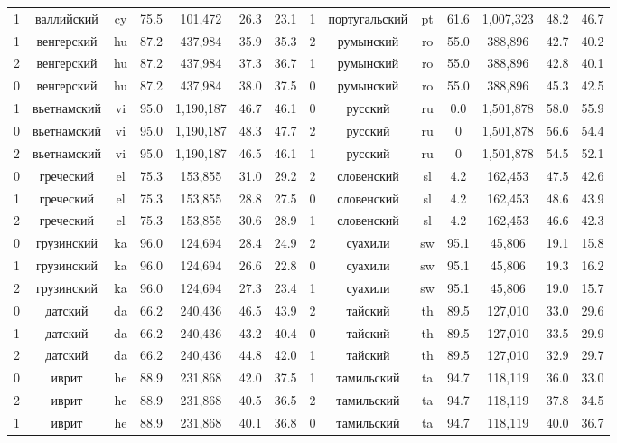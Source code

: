 \begin{table*}
{\begin{tabular}{|c|c|c|c|c|c|c|||c|c|c|c|c|c|c|}
1 & валлийский & cy & 75.5 & 101,472 & 26.3 & 23.1 & 1 & португальский & pt & 61.6 & 1,007,323 & 48.2 & 46.7\\
1 & венгерский & hu & 87.2 & 437,984 & 35.9 & 35.3 & 2 & румынский & ro & 55.0 & 388,896 & 42.7 & 40.2\\
2 & венгерский & hu & 87.2 & 437,984 & 37.3 & 36.7 & 1 & румынский & ro & 55.0 & 388,896 & 42.8 & 40.1\\
0 & венгерский & hu & 87.2 & 437,984 & 38.0 & 37.5 & 0 & румынский & ro & 55.0 & 388,896 & 45.3 & 42.5\\
1 & вьетнамский & vi & 95.0 & 1,190,187 & 46.7 & 46.1 & 0 & русский & ru & 0.0 & 1,501,878 & 58.0 & 55.9\\
0 & вьетнамский & vi & 95.0 & 1,190,187 & 48.3 & 47.7 & 2 & русский & ru & 0 & 1,501,878 & 56.6 & 54.4\\
2 & вьетнамский & vi & 95.0 & 1,190,187 & 46.5 & 46.1 & 1 & русский & ru & 0 & 1,501,878 & 54.5 & 52.1\\
0 & греческий & el & 75.3 & 153,855 & 31.0 & 29.2 & 2 & словенский & sl & 4.2 & 162,453 & 47.5 & 42.6\\
1 & греческий & el & 75.3 & 153,855 & 28.8 & 27.5 & 0 & словенский & sl & 4.2 & 162,453 & 48.6 & 43.9\\
2 & греческий & el & 75.3 & 153,855 & 30.6 & 28.9 & 1 & словенский & sl & 4.2 & 162,453 & 46.6 & 42.3\\
0 & грузинский & ka & 96.0 & 124,694 & 28.4 & 24.9 & 2 & суахили & sw & 95.1 & 45,806 & 19.1 & 15.8\\
1 & грузинский & ka & 96.0 & 124,694 & 26.6 & 22.8 & 0 & суахили & sw & 95.1 & 45,806 & 19.3 & 16.2\\
2 & грузинский & ka & 96.0 & 124,694 & 27.3 & 23.4 & 1 & суахили & sw & 95.1 & 45,806 & 19.0 & 15.7\\
0 & датский & da & 66.2 & 240,436 & 46.5 & 43.9 & 2 & тайский & th & 89.5 & 127,010 & 33.0 & 29.6\\
1 & датский & da & 66.2 & 240,436 & 43.2 & 40.4 & 0 & тайский & th & 89.5 & 127,010 & 33.5 & 29.9\\
2 & датский & da & 66.2 & 240,436 & 44.8 & 42.0 & 1 & тайский & th & 89.5 & 127,010 & 32.9 & 29.7\\
0 & иврит & he & 88.9 & 231,868 & 42.0 & 37.5 & 1 & тамильский & ta & 94.7 & 118,119 & 36.0 & 33.0\\
2 & иврит & he & 88.9 & 231,868 & 40.5 & 36.5 & 2 & тамильский & ta & 94.7 & 118,119 & 37.8 & 34.5\\
1 & иврит & he & 88.9 & 231,868 & 40.1 & 36.8 & 0 & тамильский & ta & 94.7 & 118,119 & 40.0 & 36.7\\

\end{tabular}}
\end{table*}
